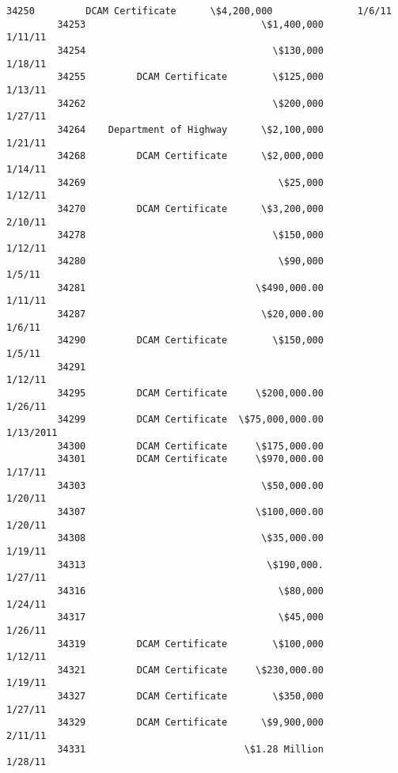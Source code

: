 \documentclass[11pt]{article}
\begin{document}
\begin{Verbatim}[commandchars=\\\{\}]
         34250         DCAM Certificate      \$4,200,000               1/6/11   
         34253                               \$1,400,000              1/11/11   
         34254                                 \$130,000              1/18/11   
         34255         DCAM Certificate        \$125,000              1/13/11   
         34262                                 \$200,000              1/27/11   
         34264    Department of Highway      \$2,100,000              1/21/11   
         34268         DCAM Certificate      \$2,000,000              1/14/11   
         34269                                  \$25,000              1/12/11   
         34270         DCAM Certificate      \$3,200,000              2/10/11   
         34278                                 \$150,000              1/12/11   
         34280                                  \$90,000               1/5/11   
         34281                              \$490,000.00              1/11/11   
         34287                               \$20,000.00               1/6/11   
         34290         DCAM Certificate        \$150,000               1/5/11   
         34291                                                       1/12/11   
         34295         DCAM Certificate     \$200,000.00              1/26/11   
         34299         DCAM Certificate  \$75,000,000.00            1/13/2011   
         34300         DCAM Certificate     \$175,000.00                        
         34301         DCAM Certificate     \$970,000.00              1/17/11   
         34303                               \$50,000.00              1/20/11   
         34307                              \$100,000.00              1/20/11   
         34308                               \$35,000.00              1/19/11   
         34313                                \$190,000.              1/27/11   
         34316                                  \$80,000              1/24/11   
         34317                                  \$45,000              1/26/11   
         34319         DCAM Certificate        \$100,000              1/12/11   
         34321         DCAM Certificate     \$230,000.00              1/19/11   
         34327         DCAM Certificate        \$350,000              1/27/11   
         34329         DCAM Certificate      \$9,900,000              2/11/11   
         34331                            \$1.28 Million              1/28/11   
         

\end{Verbatim}
\end{document}
